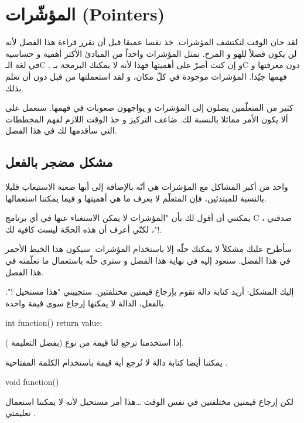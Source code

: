 \chapter{المؤشّرات (\textenglish{Pointers})}

لقد حان الوقت لنكتشف المؤشرات. خذ نفسا عميقا قبل أن تقرر قراءة هذا الفصل لأنه لن يكون فصلاً للهو و المرح. تمثل المؤشرات واحداً من المبادئ الأكثر أهمية و حساسية في لغة الـ\textenglish{C}
. و إن كنت أصرّ على أهميتها فهذا  لأنه لا يمكنك البرمجة بـ\textenglish{C}
دون معرفتها و فهمها جيّدا. المؤشرات موجودة في كلّ مكان، و لقد استعملتها من قبل دون أن تعلم بذلك.

كثير من المتعلّمين يصلون إلى المؤشرات و يواجهون صعوبات في فهمها. سنعمل على ألا يكون الأمر مماثلا بالنسبة لك. ضاعف التركيز و خذ الوقت اللازم لفهم المخططات التي سأقدمها لك في هذا الفصل.

\section{مشكل مضجر بالفعل}

واحد من أكبر المشاكل مع المؤشرات هي أنّه بالإضافة إلى أنها صعبة الاستيعاب قليلا بالنسبة للمبتدئين، فإن المتعلّم لا يعرف ما هي أهميتها و فيما يمكننا استعمالها.

يمكنني أن أقول لك بأن "المؤشرات لا يمكن الاستغناء عنها في أي برنامج
\textenglish{C}
، صدقني !"، لكنّي أعرف أن هذه الحجّة ليست كافية لك.

سأطرح عليك مشكلاً لا يمكنك حلّه إلا باستخدام المؤشرات. سيكون هذا الخيط الأحمر في هذا الفصل. سنعود إليه في نهاية هذا الفصل و سترى حلّه باستعمال ما تعلّمته في هذا الفصل.

إليك المشكل: أريد كتابة دالة تقوم بإرجاع قيمتين مختلفتين. ستجيبني "هذا مستحيل !". بالفعل، الدالة لا يمكنها إرجاع سوى قيمة واحدة.

\begin{Csource}
int function()
{
	return value;
}
\end{Csource}

إذا استخدمنا
ترجع لنا قيمة من نوع
(بفضل التعليمة
).

يمكننا أيضا كتابة دالة لا تُرجع أية قيمة باستخدام الكلمة المفتاحية
.

\begin{Csource}
void function()
{

}
\end{Csource}

لكن إرجاع قيمتين مختلفتين في نفس الوقت \dots هذا أمر مستحيل لأنه لا يمكننا استعمال تعليمتي
.


